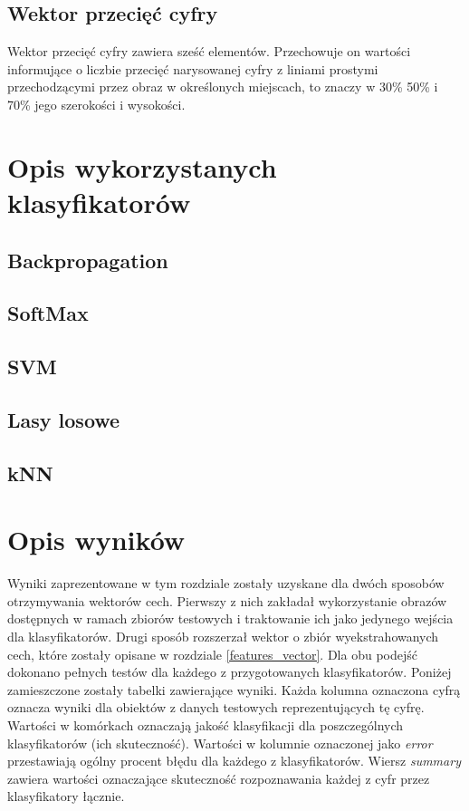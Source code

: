 \documentclass{article}
\begin{document}
\subsection{Wektor przecięć cyfry}
\label{DigitIntersectionVector}
Wektor przecięć cyfry zawiera sześć elementów. Przechowuje on wartości informujące o liczbie przecięć narysowanej cyfry z liniami prostymi przechodzącymi przez obraz w określonych miejscach, to znaczy w 30\% 50\% i 70\% jego szerokości i wysokości.

\section{Opis wykorzystanych klasyfikatorów}

\subsection{Backpropagation}
\subsection{SoftMax}
\subsection{SVM}
\subsection{Lasy losowe}
\subsection{kNN}

\section{Opis wyników}
Wyniki zaprezentowane w tym rozdziale zostały uzyskane dla dwóch sposobów otrzymywania wektorów cech. Pierwszy z nich zakładał wykorzystanie obrazów dostępnych w ramach zbiorów testowych i traktowanie ich jako jedynego wejścia dla klasyfikatorów. Drugi sposób rozszerzał wektor o zbiór wyekstrahowanych cech, które zostały opisane w rozdziale \ref{features_vector}. Dla obu podejść dokonano pełnych testów dla każdego z przygotowanych klasyfikatorów. Poniżej zamieszczone zostały tabelki zawierające wyniki. Każda kolumna oznaczona cyfrą oznacza wyniki dla obiektów z danych testowych reprezentujących tę cyfrę. Wartości w komórkach oznaczają jakość klasyfikacji dla poszczególnych klasyfikatorów (ich skuteczność). Wartości w kolumnie oznaczonej jako \textit{error} przestawiają ogólny procent błędu dla każdego z klasyfikatorów. Wiersz \textit{summary} zawiera wartości oznaczające skuteczność rozpoznawania każdej z cyfr przez klasyfikatory łącznie.
\end{document}
